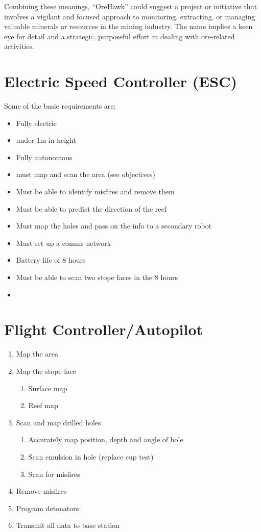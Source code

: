 	Combining these meanings, ``OreHawk'' could suggest a project or initiative that involves a vigilant and focused approach to monitoring, extracting, or managing valuable minerals or resources in the mining industry. The name implies a keen eye for detail and a strategic, purposeful effort in dealing with ore-related activities.


\section{Electric Speed Controller (ESC)}
	Some of the basic requirements are:
	\begin{itemize}
		\item Fully electric
		\item under 1m in height
		\item Fully autonomous
		\item must map and scan the area (see objectives)
		\item Must be able to identify misfires and remove them
		\item Must be able to predict the direction of the reef
		\item Must map the holes and pass on the info to a secondary robot
		\item Must set up a comms network
		\item Battery life of 8 hours
		\item Must be able to scan two stope faces in the 8 hours
		\item 
	\end{itemize}
	
\section{Flight Controller/Autopilot}

	\begin{enumerate}
		\item Map the area
		\item Map the stope face
		\begin{enumerate}
			\item Surface map
			\item Reef map
		\end{enumerate}
		\item Scan and map drilled holes
		\begin{enumerate}
			\item Accurately map position, depth and angle of hole
			\item Scan emulsion in hole (replace cup test)
			\item Scan for misfires
		\end{enumerate}
		\item Remove misfires
		\item Program detonators
		\item Transmit all data to base station
	\end{enumerate}

